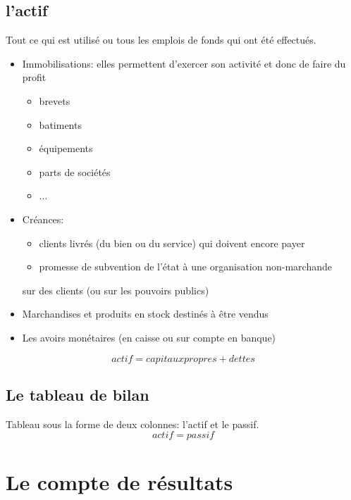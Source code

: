 \documentclass{article}
\begin{document}
\subsection{l'actif}
Tout ce qui est utilisé ou tous les emplois de fonds qui ont été effectués.
\begin{itemize}
    \item Immobilisations: elles permettent d'exercer son activité et donc de faire du profit
    \begin{itemize}
        \item brevets
        \item batiments
        \item équipements
        \item parts de sociétés
        \item ...
    \end{itemize}
    \item Créances:
    \begin{itemize}
        \item clients livrés (du bien ou du service) qui doivent encore payer
        \item promesse de subvention de l'état à une organisation non-marchande
    \end{itemize}sur des clients (ou sur les pouvoirs publics)
    \item Marchandises et produits en stock destinés à être vendus
    \item Les avoirs monétaires (en caisse ou sur compte en banque)
\end{itemize}
$$actif = capitaux propres + dettes$$

\subsection{Le tableau de bilan}
Tableau sous la forme de deux colonnes: l'actif et le passif. \\
$$actif = passif$$

\section{Le compte de résultats}
\end{document}
